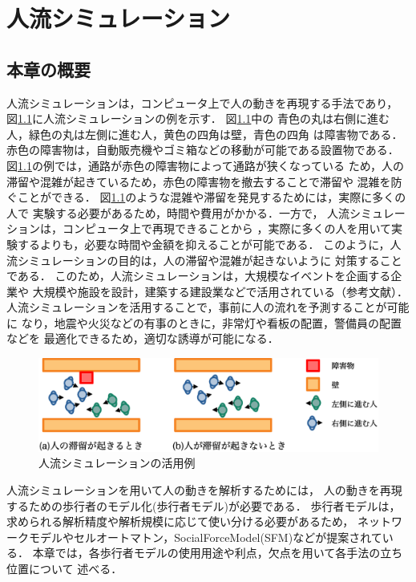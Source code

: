 
\newcommand{\eq}[1]{式（\ref{eq:#1}）}
\chapter{人流シミュレーション}
\label{sec:background}
\section{本章の概要}
人流シミュレーションは，コンピュータ上で人の動きを再現する手法であり，
図\ref{fig:jinryu_image}に人流シミュレーションの例を示す．
図\ref{fig:jinryu_image}中の
青色の丸は右側に進む人，緑色の丸は左側に進む人，黄色の四角は壁，青色の四角
は障害物である．
赤色の障害物は，自動販売機やゴミ箱などの移動が可能である設置物である．
図\ref{fig:jinryu_image}の例では，通路が赤色の障害物によって通路が狭くなっている
ため，人の滞留や混雑が起きているため，赤色の障害物を撤去することで滞留や
混雑を防ぐことができる．
図\ref{fig:jinryu_image}のような混雑や滞留を発見するためには，実際に多くの人で
実験する必要があるため，時間や費用がかかる．一方で，
人流シミュレーションは，コンピュータ上で再現できることから
，実際に多くの人を用いて実験するよりも，必要な時間や金額を抑えることが可能である．
このように，人流シミュレーションの目的は，人の滞留や混雑が起きないように
対策することである．
このため，人流シミュレーションは，大規模なイベントを企画する企業や
大規模や施設を設計，建築する建設業などで活用されている（参考文献）．
人流シミュレーションを活用することで，事前に人の流れを予測することが可能に
なり，地震や火災などの有事のときに，非常灯や看板の配置，警備員の配置などを
最適化できるため，適切な誘導が可能になる．
%
\begin{figure}[b]
    \begin{center}
     \includegraphics[width=14cm,clip]{figure/jinryu_image2_r2.eps}
     \caption{人流シミュレーションの活用例}
     \label{fig:jinryu_image}
    \end{center}
\end{figure}
%
人流シミュレーションを用いて人の動きを解析するためには，
人の動きを再現するための歩行者のモデル化(歩行者モデル)が必要である．
歩行者モデルは，求められる解析精度や解析規模に応じて使い分ける必要があるため，
ネットワークモデルやセルオートマトン，SocialForceModel(SFM)などが提案されている．
本章では，各歩行者モデルの使用用途や利点，欠点を用いて各手法の立ち位置について
述べる．

